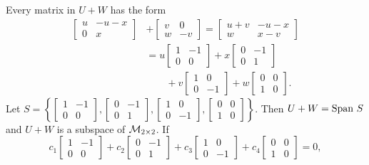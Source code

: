 \begin{example}
	\item  Every matrix in $U+W$ has the form 
\begin{align*}
\left[ \begin{array}{cc} u & -u-x \\  0 &   x \end{array} \right] &+ \left[ \begin{array}{cc}   v &  0 \\ w & -v \end{array} \right] = \left[ \begin{array}{cc}   u+v &  -u-x \\ w & x-v \end{array} \right] \\
	&= u\left[ \begin{array}{cr}   1 &  -1 \\ 0 & 0 \end{array} \right] + x\left[ \begin{array}{cr}   0 &  -1 \\ 0 & 1 \end{array} \right] \\
	&\qquad + v\left[ \begin{array}{cr}   1 &  0 \\ 0 & -1 \end{array} \right] + w\left[ \begin{array}{cc}   0 &  0 \\ 1 & 0 \end{array} \right].
\end{align*}
Let $S = \left\{ \left[ \begin{array}{cr}   1 &  -1 \\ 0 & 0 \end{array} \right], \left[ \begin{array}{cr}   0 &  -1 \\ 0 & 1 \end{array} \right], \left[ \begin{array}{cr}   1 &  0 \\ 0 & -1 \end{array} \right], \left[ \begin{array}{cc}   0 &  0 \\ 1 & 0 \end{array} \right] \right\}$. Then $U+W = \text{Span} \ S$ and $U+W$ is a subspace of $\mathcal{M}_{2 \times 2}$. If
\[c_1\left[ \begin{array}{cr}   1 &  -1 \\ 0 & 0 \end{array} \right] + c_2\left[ \begin{array}{cr}   0 &  -1 \\ 0 & 1 \end{array} \right] + c_3\left[ \begin{array}{cr}   1 &  0 \\ 0 & -1 \end{array} \right] + c_4\left[ \begin{array}{cc}   0 &  0 \\ 1 & 0 \end{array} \right] = 0,\]

\end{example}
